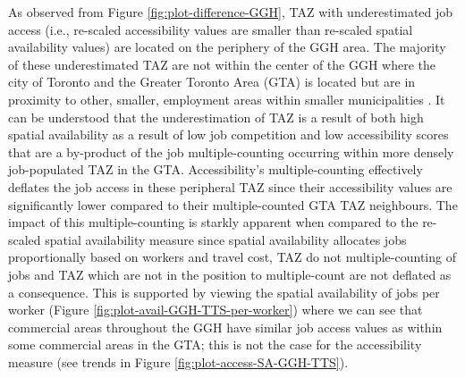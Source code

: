 \documentclass[]{elsarticle} %
\begin{document}
As observed from Figure \ref{fig:plot-difference-GGH}, TAZ with
underestimated job access (i.e., re-scaled accessibility values are
smaller than re-scaled spatial availability values) are located on the
periphery of the GGH area. The majority of these underestimated TAZ are
not within the center of the GGH where the city of Toronto and the
Greater Toronto Area (GTA) is located but are in proximity to other,
smaller, employment areas within smaller municipalities . It can be
understood that the underestimation of TAZ is a result of both high
spatial availability as a result of low job competition and low
accessibility scores that are a by-product of the job multiple-counting
occurring within more densely job-populated TAZ in the GTA.
Accessibility's multiple-counting effectively deflates the job access in
these peripheral TAZ since their accessibility values are significantly
lower compared to their multiple-counted GTA TAZ neighbours. The impact
of this multiple-counting is starkly apparent when compared to the
re-scaled spatial availability measure since spatial availability
allocates jobs proportionally based on workers and travel cost, TAZ do
not multiple-counting of jobs and TAZ which are not in the position to
multiple-count are not deflated as a consequence. This is supported by
viewing the spatial availability of jobs per worker (Figure
\ref{fig:plot-avail-GGH-TTS-per-worker}) where we can see that
commercial areas throughout the GGH have similar job access values as
within some commercial areas in the GTA; this is not the case for the
accessibility measure (see trends in Figure
\ref{fig:plot-access-SA-GGH-TTS}).
\end{document}
